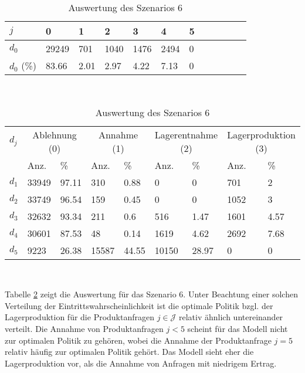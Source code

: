 \begin{table}[h!]
\renewcommand{\arraystretch}{1.5}
  \begin{center}
    \caption{Auswertung des Szenarios 6}  \label{AS6}
    \vspace*{3mm}
    \begin{tabular}{l l l l l l l l l l l l }  \hline 
         $j$ & 0 & 1  & 2 & 3 & 4  & 5   \\  \hline
$d_{0}$ &  29249 &   701 &  1040 &  1476 &  2494 &  0 \\
$d_{0}$ (\%) &  83.66 &  2.01 &  2.97 &  4.22 &  7.13 &  0 \\
\hline
    \end{tabular} \\[3mm]
        \begin{tabular}{ l l l l l l l l l}   \hline    %
    $d_j$ & \multicolumn{2}{c}{Ablehnung (0)} & \multicolumn{2}{c}{Annahme (1)}  & \multicolumn{2}{c}{Lagerentnahme (2)} & \multicolumn{2}{c}{Lagerproduktion (3)}\\
    & Anz. & \% & Anz. & \% & Anz. & \% & Anz. & \% \\ \hline 
$d_{1}$ &  33949 &  97.11 &    310 &   0.88 &    0 &    0 &   701 &     2 \\
$d_{2}$ &  33749 &  96.54 &    159 &   0.45 &    0 &    0 &  1052 &     3 \\ 
$d_{3}$ &  32632 &  93.34 &    211 &    0.6 &    516 &   1.47 &  1601 &  4.57 \\
$d_{4}$ &  30601 &  87.53 &     48 &   0.14 &   1619 &   4.62 &  2692 &  7.68 \\
$d_{5}$ &   9223 &  26.38 &  15587 &  44.55 &  10150 &  28.97 &   0 &   0 \\
          \hline
   \end{tabular} \\[3mm]
     \end{center}
\end{table}

Tabelle \ref{AS6} zeigt die Auswertung für das Szenario 6. Unter Beachtung einer solchen Verteilung der Eintrittswahrscheinlichkeit ist die optimale Politik bzgl. der Lagerproduktion für die Produktanfragen $j\in\mathcal{J}$ relativ ähnlich untereinander verteilt. Die Annahme von Produktanfragen $j<5$ scheint für das Modell nicht zur optimalen Politik zu gehören, wobei die Annahme der Produktanfrage $j=5$ relativ häufig zur optimalen Politik gehört. Das Modell sieht eher die Lagerproduktion vor, als die Annahme von Anfragen mit niedrigem Ertrag. %

